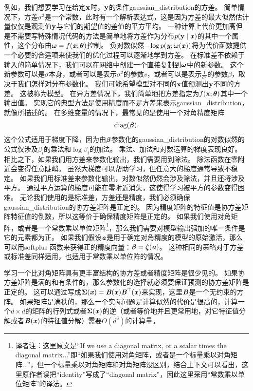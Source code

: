 例如，我们想要学习在给定$\mathbf{x}$时，$\mathbf{y}$的条件\gls{gaussian_distribution}的方差。
简单情况下，方差$\sigma^2$是一个常数，此时有一个解析表达式，这是因为方差的最大似然估计量仅仅是观测值$\mathbf{y}$与它们的期望值的差值的平方平均。
一种计算上代价更加高但是不需要写特殊情况代码的方法是简单地将方差作为分布$p(\mathbf{y}\mid\boldsymbol{\mathit{x}})$的其中一个属性，这个分布由$\boldsymbol{\omega}=f(\boldsymbol{\mathit{x}};\boldsymbol{\theta})$控制。
负对数似然$-\log p(\boldsymbol{\mathit{y}};\boldsymbol{\omega}(\boldsymbol{\mathit{x}}))$将为代价函数提供一个必要的合适项来使我们的优化过程可以逐渐地学到方差。
在标准差不依赖于输入的简单情况下，我们可以在网络中创建一个直接复制到$\boldsymbol{\omega}$中的新参数。
这个新参数可以是$\sigma$本身，或者可以是表示$\sigma^2$的参数$v$，或者可以是表示$\frac{1}{\sigma^2}$的参数$\beta$，取决于我们怎样对分布参数化。
我们可能希望模型对不同的$\mathbf{x}$值预测出$\mathbf{y}$不同的方差。
这被称为模型。
在异方差情况下，我们简单地把方差指定为$f(\mathbf{x};\boldsymbol{\theta})$其中一个输出值。
实现它的典型方法是使用精度而不是方差来表示\gls{gaussian_distribution}，就像所描述的。
在多维变量的情况下，最常见的是使用一个对角精度矩阵
\begin{equation}
\text{diag}(\boldsymbol{\beta}).
\end{equation}
这个公式适用于梯度下降，因为由$\boldsymbol{\beta}$参数化的\gls{gaussian_distribution}的对数似然的公式仅涉及$\beta_i$的乘法和$\log \beta_i$的加法。
乘法、加法和对数运算的梯度表现良好。
相比之下，如果我们用方差来参数化输出，我们需要用到除法。
除法函数在零附近会变得任意陡峭。
虽然大梯度可以帮助学习，但任意大的梯度通常导致不稳定。
如果我们用标准差来参数化输出，对数似然仍然会涉及除法，并且还将涉及平方。
通过平方运算的梯度可能在零附近消失，这使得学习被平方的参数变得困难。
无论我们使用的是标准差，方差还是精度，我们必须确保\gls{gaussian_distribution}的协方差矩阵是正定的。
因为精度矩阵的特征值是协方差矩阵特征值的倒数，所以这等价于确保精度矩阵是正定的。
如果我们使用对角矩阵，或者是一个常数乘以单位矩阵\footnote{译者注：这里原文是``If we use a diagonal matrix, or a scalar times the diagonal matrix...''即``如果我们使用对角矩阵，或者是一个标量乘以对角矩阵...''，但一个标量乘以对角矩阵和对角矩阵没区别，结合上下文可以看出，这里原作者误把``identity''写成了``diagonal matrix''，因此这里采用``常数乘以单位矩阵''的译法。}，那么我们需要对模型输出强加的唯一条件是它的元素都为正。
如果我们假设$\boldsymbol{\mathit{a}}$是用于确定对角精度的模型的原始激活，那么可以用softplus 函数来获得正的精度向量：$\boldsymbol{\beta}=\boldsymbol{\zeta}(\boldsymbol{\mathit{a}})$。
这种相同的策略对于方差或标准差同样适用，也适用于常数乘以单位阵的情况。


学习一个比对角矩阵具有更丰富结构的协方差或者精度矩阵是很少见的。
如果协方差矩阵是满的和有条件的，那么参数化的选择就必须要保证预测的协方差矩阵是正定的。
这可以通过写成$\boldsymbol{\Sigma}(\boldsymbol{\mathit{x}})=\boldsymbol{\mathit{B}}(\boldsymbol{\mathit{x}})\boldsymbol{\mathit{B}}^\top (\boldsymbol{\mathit{x}})$来实现，这里$\boldsymbol{\mathit{B}}$是一个无约束的方阵。
如果矩阵是满秩的，那么一个实际问题是计算似然的代价是很高的，计算一个$d\times d$的矩阵的行列式或者$\boldsymbol{\Sigma}(\boldsymbol{\mathit{x}})$的逆（或者等价地并且更常用地，对它特征值分解或者$\boldsymbol{\mathit{B}}(\boldsymbol{\mathit{x}})$的特征值分解）需要$O(d^3)$的计算量。

